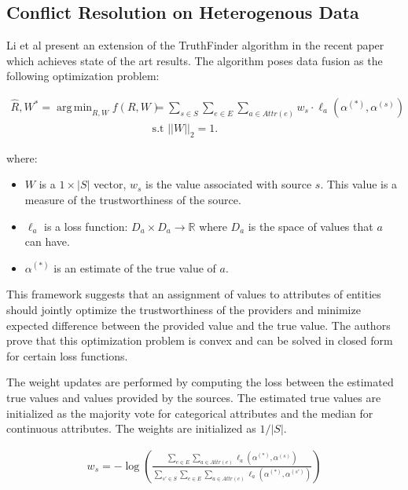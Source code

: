 \documentclass{acm_proc_article-sp}
\DeclareMathOperator*{\argmin}{arg\,min}
\begin{document}
\subsection{Conflict Resolution on Heterogenous Data}

Li et al present an extension of the {\sc TruthFinder} algorithm in the recent paper \cite{li:resolving} which achieves state of the art results. The algorithm poses data fusion as the following optimization problem: 

\begin{align}
\hat{R}, W^* = \argmin_{R,W} f(R, W) & = \sum_{s \in S} \sum_{e \in E} \sum_{a \in Attr(e)} w_s \cdot \ell_a(\alpha^{(*)}, \alpha^{(s)}) \\
& \text{s.t } ||W||_2 =1. \nonumber 
\end{align}

where: 

\begin{itemize}
\item $W$ is a $1\times|S|$ vector, $w_s$ is the value associated with source $s$. This value is a measure of the trustworthiness of the source. 
\item $\ell_a$ is a loss function: $D_a \times D_a \rightarrow \mathbb{R}$ where $D_a$ is the space of values that $a$ can have. 
\item $\alpha^{(*)}$ is an estimate of the true value of $a$. 
\end{itemize}

This framework suggests that an assignment of values to attributes of entities should jointly optimize the trustworthiness of the providers and minimize expected difference between the provided value and the true value. The authors prove that this optimization problem is convex and can be solved in closed form for certain loss functions. 

The weight updates are performed by computing the loss between the estimated true values and values provided by the sources. The estimated true values are initialized as the majority vote for categorical attributes and the median for continuous attributes. The weights are initialized as $1/|S|$.


\begin{align}
w_s = - \log \left ( \frac{\sum_{e \in E} \sum_{a \in Attr(e)} \ell_a(\alpha^{(*)}, \alpha^{(s)})}{\sum_{s' \in S} \sum_{e \in E}  \sum_{a \in Attr(e)} \ell_a(\alpha^{(*)}, \alpha^{(s')})} \right )
\end{align}
\end{document}
